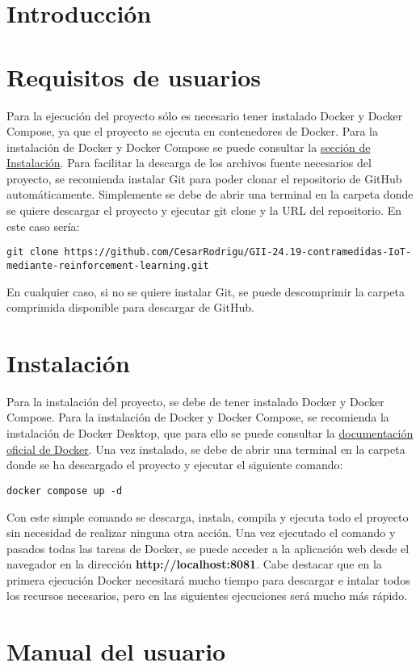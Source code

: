 
\section{Introducción}

\section{Requisitos de usuarios}
\label{sec:requisitos-usuarios}

Para la ejecución del proyecto sólo es necesario tener instalado Docker y Docker Compose, ya que el proyecto se ejecuta en contenedores de Docker. Para la instalación de Docker y Docker Compose se puede consultar la \hyperref[sec:instalacion]{sección de Instalación}.
Para facilitar la descarga de los archivos fuente necesarios del proyecto, se recomienda instalar Git para poder clonar el repositorio de GitHub automáticamente. Simplemente se debe de abrir una terminal en la carpeta donde se quiere descargar el proyecto y ejecutar git clone y la URL del repositorio. En este caso sería:
\begin{verbatim}
git clone https://github.com/CesarRodrigu/GII-24.19-contramedidas-IoT-mediante-reinforcement-learning.git
\end{verbatim}
En cualquier caso, si no se quiere instalar Git, se puede descomprimir la carpeta comprimida disponible para descargar de GitHub.

\section{Instalación}
\label{sec:instalacion}
Para la instalación del proyecto, se debe de tener instalado Docker y Docker Compose. Para la instalación de Docker y Docker Compose, se recomienda la instalación de Docker Desktop, que para ello se puede consultar la \href{https://docs.docker.com/get-docker/}{documentación oficial de Docker}. Una vez instalado, se debe de abrir una terminal en la carpeta donde se ha descargado el proyecto y ejecutar el siguiente comando:
\begin{verbatim}
docker compose up -d
\end{verbatim}
Con este simple comando se descarga, instala, compila y ejecuta todo el proyecto sin necesidad de realizar ninguna otra acción.
Una vez ejecutado el comando y pasados todas las tareas de Docker, se puede acceder a la aplicación web desde el navegador en la dirección \textbf{http://localhost:8081}. Cabe destacar que en la primera ejecución Docker necesitará mucho tiempo para descargar e intalar todos los recursos necesarios, pero en las siguientes ejecuciones será mucho más rápido.

\section{Manual del usuario}


